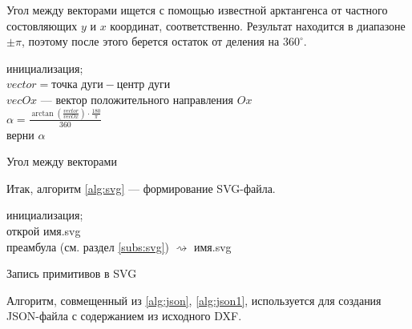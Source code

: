 Угол между векторами ищется с помощью известной арктангенса от частного состовляющих $y$ и $x$ координат, соответственно. Результат находится в диапазоне $\pm\pi$, поэтому после этого берется остаток от деления на $360^\circ$.

\begin{algorithm}[H]
	\SetAlgoLined
	инициализация;\\
	$vector=\text{точка дуги}-\text{центр дуги}$\\
	$vecOx$ --- вектор положительного направления $Ox$\\
	$\alpha=\frac{\arctan(\frac{vector}{vecOx})\cdot\frac{180}{\pi}}{360}$\\
	верни $\alpha$
	\caption{Угол между векторами}
	\label{alg:angle_vectors}
\end{algorithm}
\hfill \break

Итак, алгоритм \ref{alg:svg} --- формирование SVG-файла.

\begin{algorithm}[H]
	\SetAlgoLined
	инициализация;\\
	открой имя.svg\\
	преамбула (см. раздел \ref{subs:svg}) $\rightsquigarrow$ имя.svg\\
	\caption{Запись примитивов в SVG}
	\label{alg:svg}
\end{algorithm}

Алгоритм, совмещенный из \ref{alg:json}, \ref{alg:json1}, используется для создания JSON-файла с содержанием из исходного DXF.

